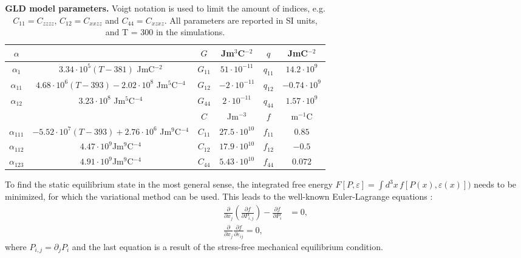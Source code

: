 \begin{table}
\begin{tabular}{|c|c|c|c|c|c|}
	\hline
	 $\alpha$ & & $G$ & Jm$^3$C$^{-2}$& $q$ & JmC$^{-2}$\\
	 \hline
	 $\alpha_1$ & $3.34\cdot 10^5 (T - 381)$  JmC$^{-2}$& $G_{11}$ & $51 \cdot 10^{-11}$ & $q_{11}$ & $14.2 \cdot 10^{9}$ \\
	 $\alpha_{11}$ & $4.68 \cdot 10^6 (T-393) - 2.02 \cdot 10^8$ Jm$^5$C$^{-4}$& $G_{12}$ & $-2 \cdot 10^{-11}$ & $q_{12}$ & $-0.74 \cdot 10^{9}$ \\
	 $\alpha_{12}$ & $3.23 \cdot 10^8$ Jm$^5$C$^{-4}$ & $G_{44}$ & $2 \cdot 10^{-11}$  & $q_{44}$ & $1.57 \cdot 10^{9}$ \\
	 \cline{3-6}
	 & & $C$ &Jm$^{-3}$ & $f$ & m$^{-1}$C\\
	 \cline{3-6}
	 $\alpha_{111}$ & $-5.52 \cdot 10^7 (T - 393) + 2.76 \cdot 10^6 $ Jm$^9$C$^{-4}$ & $C_{11}$ & $27.5 \cdot 10^{10}$ & $f_{11}$ & $0.85$ \\
	 $\alpha_{112}$ &  $4.47 \cdot 10^9 $Jm$^9$C$^{-4}$  & $C_{12}$ & $17.9 \cdot 10^{10}$ & $f_{12}$ & $-0.5$  \\
	 $\alpha_{123}$ & $4.91 \cdot 10^9$Jm$^9$C$^{-4}$  &$C_{44}$ & $5.43 \cdot 10^{10}$ & $f_{44}$ & $ 0.072$ \\
	 \hline
\end{tabular}
\caption{{\bf GLD model parameters.} Voigt notation \cite{Voigt} is used to limit the amount of indices, e.g. $C_{11} = C_{zzzz}$, $C_{12} = C_{xxzz}$ and $C_{44}= C_{xzxz}$.  All parameters are reported in SI units, and T = 300 in the simulations.\label{tab:BTO_param}}
\end{table}

To find the static equilibrium state in the most general sense, the integrated free energy $F[P,\varepsilon] = \int d^3x \,f[P(x), \varepsilon(x)])$ needs to be minimized, for which the variational method can be used.
This leads to the well-known Euler-Lagrange equations \cite{Cao1991, Marton2010}:
\begin{align}
	\label{eq:BTO_euler}
	\frac{\partial}{\partial x_j}\left( \frac{\partial f}{\partial P_{i,j}}\right) - \frac{\partial f}{\partial P_i} &= 0, \\
	\frac{\partial}{\partial x_j}\frac{\partial f}{\partial \varepsilon_{ij}} = 0,
\end{align}
where $P_{i,j} = \partial_j P_i$ and the last equation is a result of the stress-free mechanical equilibrium condition.

